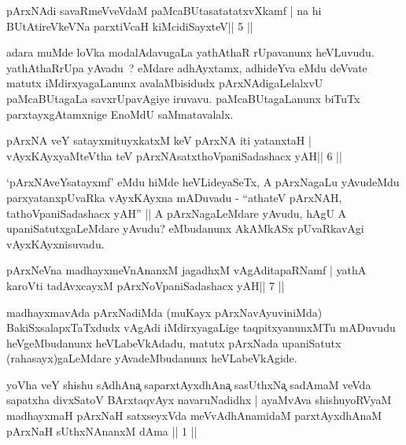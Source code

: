 \begin{shl}
pArxNAdi savaRmeVveVdaM paMcaBUtasatatatxvXkamf |
na hi BUtAtireVkeVNa parxtiVcaH kiMcidiSayxteV\hfill || 5 ||
\end{shl}

\begin{artha}
adara muMde loVka modalAdavugaLa yathAthaR rUpavanunx heVLuvudu. yathAthaRrUpa yAvadu~? eMdare adhAyxtamx, adhideYva eMdu deVvate matutx iMdirxyagaLanunx avalaMbisidudx pArxNAdigaLelalxvU paMcaBUtagaLa savxrUpavAgiye iruvavu. paMcaBUtagaLanunx biTuTx parxtayxgAtamxnige EnoMdU saMmatavalalx.
\end{artha}

\begin{shl}
pArxNA veY satayxmituyxkatxM keV pArxNA iti yatanxtaH |
vAyxKAyxyaMteV\s tha teV pArxNAsatxthoVpaniSadashacx yAH\hfill || 6 ||
\end{shl}

\begin{artha}
`pArxNAveYsatayxmf' eMdu hiMde heVLideyaSeTx, A pArxNagaLu yAvudeMdu   parxyatanxpUvaRka vAyxKAyxna mADuvadu - ``athateV pArxNAH,   tathoVpaniSadashacx yAH'' || A pArxNagaLeMdare yAvudu, hAgU A   upaniSatutxgaLeMdare yAvudu? eMbudanunx AkAMkASx pUvaRkavAgi   vAyxKAyxnisuvadu.
\end{artha}



\begin{shl}
pArxNeVna madhayxmeVnAnanxM jagadhxM vAgAditapaRNamf |
yathA karoVti tadAvxcayxM pArxNoVpaniSadashacx yAH\hfill || 7 ||
\end{shl}

\begin{artha}
madhayxmavAda pArxNadiMda (muKayx pArxNavAyuviniMda) BakiSxsalapxTaTxdudx vAgAdi iMdirxyagaLige taqpitxyanunxMTu mADuvudu heVgeMbudanunx heVLabeVkAdadu, matutx pArxNada upaniSatutx (rahasayx)gaLeMdare yAvadeMbudanunx heVLabeVkAgide.
\end{artha}

\newpage
\begin{kandikeshl}
yoVha veY shishu sAdhAna{\c} saparxtAyxdhAna{\c} sasUthxNa{\c} sadAmaM veVda
sapatxha divxSatoV BArxtaqvAyx navaruNadidhx | ayaMvAva shishuyoRVyaM
madhayxmaH pArxNaH satxseyxVda meVvAdhAnamidaM parxtAyxdhAnaM pArxNaH
sUthxNAnanxM dAma || 1 ||
\end{kandikeshl}

